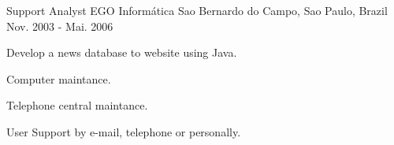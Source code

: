 \begin{cventries}
  \cventry
    {Support Analyst} %
    {EGO Informática} %
    {Sao Bernardo do Campo, Sao Paulo, Brazil} %
    {Nov. 2003 - Mai. 2006} %
    {
      \begin{cvitems} %
        \item {Develop a news database to website using Java.}
        \item {Computer maintance.}
        \item {Telephone central maintance.}
        \item {User Support by e-mail, telephone or personally.}
      \end{cvitems}
    }

\end{cventries}
